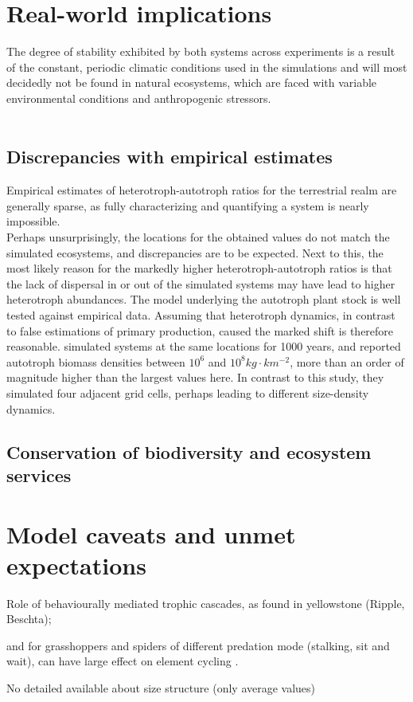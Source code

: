 \section{Real-world implications}
%
The degree of stability exhibited by both systems across experiments is a result of the constant, periodic climatic conditions used in the simulations and will most decidedly not be found in natural ecosystems, which are faced with variable environmental conditions and anthropogenic stressors. 
\\\\
\subsection{Discrepancies with empirical estimates}
Empirical estimates of heterotroph-autotroph ratios for the terrestrial realm are generally sparse, as fully characterizing and quantifying a system is nearly impossible.\\ 
Perhaps unsurprisingly, the locations for the obtained values do not match the simulated ecosystems, and discrepancies are to be expected. Next to this, the most likely reason for the markedly higher heterotroph-autotroph ratios is that the lack of dispersal in or out of the simulated systems may have lead to higher heterotroph abundances. The model \citep{Smith2012} underlying the autotroph plant stock is well tested against empirical data. Assuming that heterotroph dynamics, in contrast to false estimations of primary production, caused the marked shift is therefore reasonable. \cite{Harfoot2014} simulated systems at the same locations for 1000 years, and reported autotroph biomass densities between $10^{6}$ and $10^{8} kg\cdot km^{-2}$, more than an order of magnitude higher than the largest values here. In contrast to this study, they simulated four adjacent grid cells, perhaps leading to different size-density dynamics.
\subsection{Conservation of biodiversity and ecosystem services}

\section{Model caveats and unmet expectations}
Role of behaviourally mediated trophic cascades,  as found in yellowstone (Ripple, Beschta);

 and for grasshoppers and spiders of different predation mode (stalking, sit and wait), can have large effect on element cycling \cite{Schmitz2015}.
 
No detailed available about size structure (only average values)
